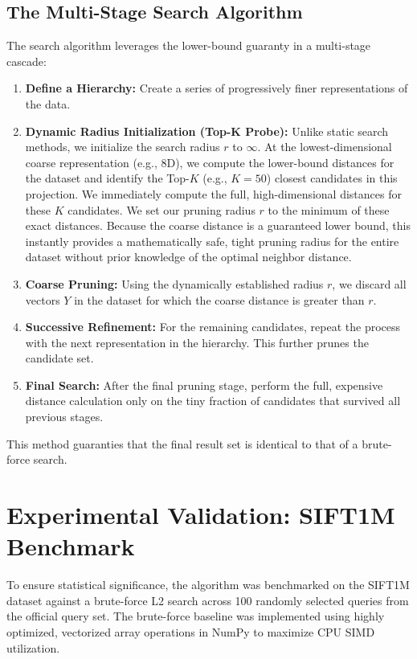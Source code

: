 \documentclass[sigconf,nonacm]{acmart}
\begin{document}
\subsection{The Multi-Stage Search Algorithm}

The search algorithm leverages the lower-bound guaranty in a multi-stage cascade:
\begin{enumerate}
    \item \textbf{Define a Hierarchy:} Create a series of progressively finer representations of the data.
    \item \textbf{Dynamic Radius Initialization (Top-K Probe):} Unlike static search methods, we initialize the search radius $r$ to $\infty$. At the lowest-dimensional coarse representation (e.g., 8D), we compute the lower-bound distances for the dataset and identify the Top-$K$ (e.g., $K=50$) closest candidates in this projection. We immediately compute the full, high-dimensional distances for these $K$ candidates. We set our pruning radius $r$ to the minimum of these exact distances. Because the coarse distance is a guaranteed lower bound, this instantly provides a mathematically safe, tight pruning radius for the entire dataset without prior knowledge of the optimal neighbor distance.
    \item \textbf{Coarse Pruning:} Using the dynamically established radius $r$, we discard all vectors $Y$ in the dataset for which the coarse distance is greater than $r$.
    \item \textbf{Successive Refinement:} For the remaining candidates, repeat the process with the next representation in the hierarchy. This further prunes the candidate set.
    \item \textbf{Final Search:} After the final pruning stage, perform the full, expensive distance calculation only on the tiny fraction of candidates that survived all previous stages.
\end{enumerate}
This method guaranties that the final result set is identical to that of a brute-force search.

\section{Experimental Validation: SIFT1M Benchmark}
To ensure statistical significance, the algorithm was benchmarked on the SIFT1M dataset against a brute-force L2 search across 100 randomly selected queries from the official query set. The brute-force baseline was implemented using highly optimized, vectorized array operations in NumPy to maximize CPU SIMD utilization.
\end{document}
